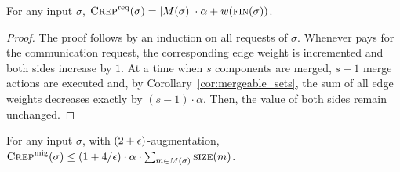 \begin{lemma}
\label{lem:crep_req}
For any input $\sigma$, $\textsc{Crep}^\textnormal{req}(\sigma) = |M(\sigma)| \cdot \alpha + w(\textsc{fin}(\sigma))$.
\end{lemma}

\begin{proof}
The proof follows by an induction on all requests of $\sigma$. Whenever \CREP
pays for the communication request, the corresponding edge weight is incremented
and both sides increase by $1$. At a time when $s$ components are merged, $s-1$
merge actions are executed and, by Corollary~\ref{cor:mergeable_sets}, the sum of all
edge weights decreases exactly by $(s-1) \cdot \alpha$. Then, the value of both
sides remain unchanged.
\end{proof}

\begin{lemma}
\label{lem:crep_mig}
For any input $\sigma$, with $(2+\epsilon)$-augmentation, 
$\textsc{Crep}^\textnormal{mig}(\sigma) \leq (1+4/\epsilon) \cdot \alpha \cdot \sum_{m \in M(\sigma)} \textsc{size}(m)$.
\end{lemma}


